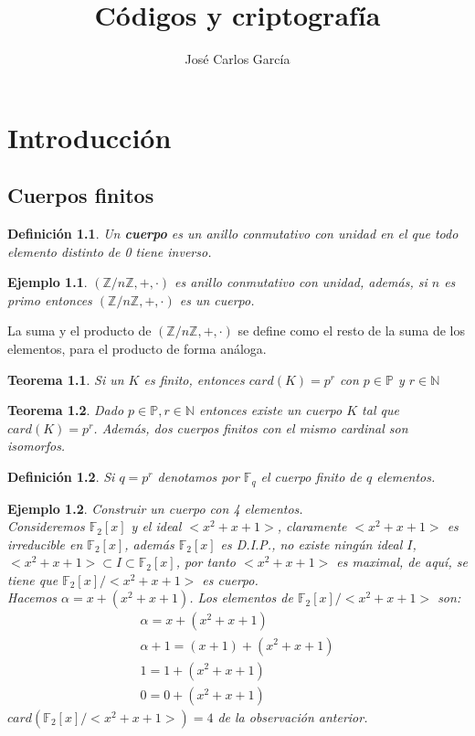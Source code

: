 \documentclass[spanish]{book}
\title{Códigos y criptografía\\ \byncsa}
\author{José Carlos García}
\newtheorem{mydef}{Definición}
\newtheorem{ejem}{Ejemplo}
\newtheorem{teorema}{Teorema}
\begin{document}
\maketitle
\tableofcontents

\chapter{Introducción}
\section{Cuerpos finitos}

\begin{mydef}
	Un \textbf{cuerpo} es un anillo conmutativo con unidad en el que todo elemento distinto de 0 tiene inverso.
\end{mydef}

\begin{ejem}
	$(\mathbb{Z}/ n \mathbb{Z}, +, \cdot)$ es anillo conmutativo con unidad, además, si $n$ es primo entonces $(\mathbb{Z}/ n \mathbb{Z}, +, \cdot)$ es un cuerpo.
\end{ejem} 
La suma y el producto de $(\mathbb{Z} / n \mathbb{Z}, +, \cdot)$ se define como el resto de la suma de los elementos, para el producto de forma análoga. \\
\begin{teorema}
	Si un $K$ es finito, entonces $card(K)=p^r$ con $p \in \mathbb{P}$ y $r \in \mathbb{N}$
\end{teorema}
\begin{teorema}
	Dado $p \in \mathbb{P}, r \in \mathbb{N}$ entonces existe un cuerpo $K$ tal que $card(K)=p^r$. 
	Además, dos cuerpos finitos con el mismo cardinal son isomorfos.
\end{teorema}
\begin{mydef}
	Si $q=p^r$ denotamos por $\mathbb{F}_q$ el cuerpo finito de $q$ elementos.
\end{mydef}

\begin{ejem}
	Construir un cuerpo con 4 elementos. \\
	Consideremos $\mathbb{F}_2[x]$ y el ideal $<x^2+x+1>$, claramente $<x^2+x+1>$ es irreducible en $\mathbb{F}_2[x]$, además $\mathbb{F}_2[x]$ es D.I.P., no existe ningún ideal $I$, $<x^2+x+1> \subset I \subset \mathbb{F}_2[x]$, por tanto $<x^2+x+1>$ es maximal, de aquí, se tiene que $\mathbb{F}_2[x] / <x^2+x+1>$ es cuerpo.\\
	Hacemos $\alpha = x+(x^2+x+1)$. Los elementos de $\mathbb{F}_2[x] / <x^2+x+1>$ son: 
	\begin{eqnarray}
	\alpha = x+(x^2+x+1) \nonumber \\
	\alpha + 1 = (x+1)+(x^2+x+1) \nonumber \\
	1 = 1 + (x^2+x+1) \nonumber \\
	0 = 0 + (x^2+x+1) \nonumber
	\end{eqnarray}
	$card(\mathbb{F}_2[x] / <x^2+x+1>)=4$ de la observación anterior.
\end{ejem}
\end{document}
